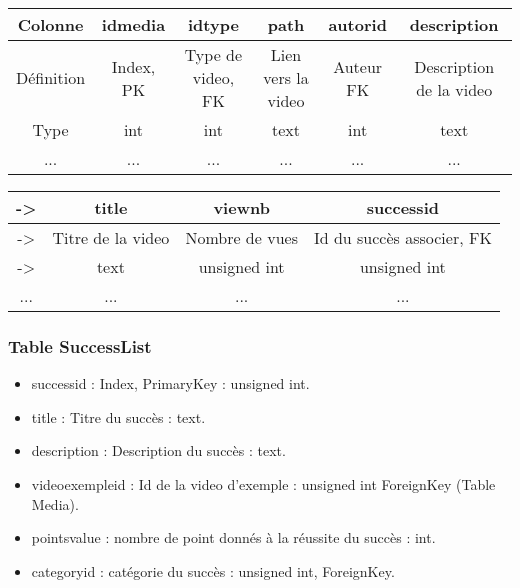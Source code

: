 \documentclass[a4paper,10pt]{article}
\begin{document}
\begin{table}[h]
\centering
\begin{tabular}{|c|c|c|c|c|c|}
\hline
Colonne    & idmedia   & idtype            & path               & autorid  & description             \\ \hline
Définition & Index, PK & Type de video, FK & Lien vers la video & Auteur FK & Description de la video \\ \hline
Type       & int       & int               & text               & int       & text                    \\ \hline
...        & ...       & ...               & ...                & ...       & ...                    
\end{tabular}
\end{table}

\begin{table}[h]
\centering
\begin{tabular}{|c|c|c|c|}
\hline
-\textgreater & title             & viewnb         & successid             \\ \hline
-\textgreater & Titre de la video & Nombre de vues & Id du succès associer, FK \\ \hline
-\textgreater & text              & unsigned int   & unsigned int          \\ \hline
...           & ...               & ...            & ...                  
\end{tabular}
\end{table}

\subsubsection{Table SuccessList}

\begin{itemize}
\item successid : Index, PrimaryKey : unsigned int.
\item title : Titre du succès : text.
\item description : Description du succès : text.
\item videoexempleid : Id de la video d'exemple : unsigned int ForeignKey (Table Media).
\item pointsvalue : nombre de point donnés à la réussite du succès : int.
\item categoryid : catégorie du succès : unsigned int, ForeignKey.
\end{itemize}
\end{document}
